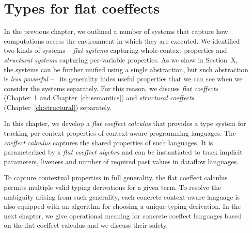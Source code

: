 
\setcounter{chapter}{3}
\chapter{Types for flat coeffects}
\label{ch:flat}

In the previous chapter, we outlined a number of systems that capture how computations
access the environment in which they are executed. We identified two kinds of systems --
\emph{flat systems} capturing whole-context properties and \emph{structural systems} capturing
per-variable properties. As we show in Section~X, the systems can be further unified using a
single abstraction, but such abstraction is \emph{less powerful} -- \ie~its generality hides
useful properties that we can see when we consider the systems separately. For this reason, we
discuss \emph{flat coeffects} (Chapter~\ref{ch:flat} and Chapter~\ref{ch:semantics}) and
\emph{structural coeffects} (Chapter~\ref{ch:structural}) separately.

In this chapter, we develop a \emph{flat coeffect calculus} that provides a type system for
tracking per-context properties of context-aware programming languages. The \emph{coeffect
calculus} captures the shared properties of such languages. It is parameterized by a \emph{flat
coeffect algebra} and can be instantiated to track implicit parameters, liveness and number of
required past values in dataflow languages.

To capture contextual properties in full generality, the flat coeffect calculus permits multiple
valid typing derivations for a given term. To resolve the ambiguity arising from such generality,
each concrete context-aware language is also equipped with an algorithm for choosing a unique
typing derivation. In the next chapter, we give operational meaning for concrete coeffect
languages based on the flat coeffect calculus and we discuss their safety.

